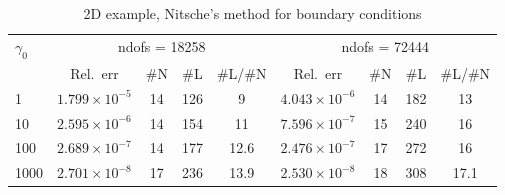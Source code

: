 \documentclass[12pt]{article}
\begin{document}
\begin{table}[h!]
    \centering
\begin{tabular}{lcccccccc}\toprule
$\gamma_0$ & \multicolumn{4}{c}{ndofs = 18258} & \multicolumn{4}{c}{ndofs = 72444}
\\\cmidrule(lr){2-5}\cmidrule(lr){6-9}
        & Rel.~err &\#N& \#L & \#L/\#N& Rel.~err &\#N& \#L & \#L/\#N\\\midrule
1 &$1.799 \times 10^{-5}$& 14 & 126 & 9 &$4.043\times 10^{-6}$ & 14 & 182& 13\\
10 & $2.595 \times 10^{-6}$ & 14 & 154 & 11 &$7.596\times 10^{-7}$ & 15 & 240 & 16\\
100  &  $2.689\times 10^{-7}$ & 14 & 177 & 12.6 &  $2.476\times 10^{-7}$ & 17 & 272 & 16\\
1000 & $2.701\times 10^{-8}$ & 17 & 236 & 13.9 & $2.530 \times 10^{-8}$ & 18 & 308 & 17.1\\
\bottomrule
\end{tabular}
\caption{2D example, Nitsche's method for boundary conditions}
\end{table}
\end{document}
